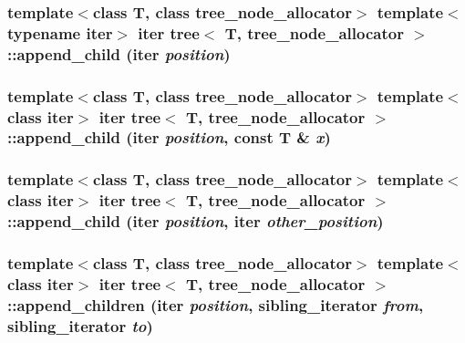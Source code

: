 \hypertarget{classtree_8d68e95f5088d48cb54fd6ae381729f0}{
\subsubsection{\setlength{\rightskip}{0pt plus 5cm}template$<$class T, class tree\_\-node\_\-allocator$>$ template$<$typename iter$>$ iter {\bf tree}$<$ T, tree\_\-node\_\-allocator $>$::append\_\-child (iter {\em position})}}
\label{classtree_8d68e95f5088d48cb54fd6ae381729f0}


\hypertarget{classtree_9318fa77c4e10ec0a9a26a0d08f182a2}{
\subsubsection{\setlength{\rightskip}{0pt plus 5cm}template$<$class T, class tree\_\-node\_\-allocator$>$ template$<$class iter$>$ iter {\bf tree}$<$ T, tree\_\-node\_\-allocator $>$::append\_\-child (iter {\em position}, \/  const T \& {\em x})}}
\label{classtree_9318fa77c4e10ec0a9a26a0d08f182a2}


\hypertarget{classtree_1fb4734b783fed4a66c24130af67316e}{
\subsubsection{\setlength{\rightskip}{0pt plus 5cm}template$<$class T, class tree\_\-node\_\-allocator$>$ template$<$class iter$>$ iter {\bf tree}$<$ T, tree\_\-node\_\-allocator $>$::append\_\-child (iter {\em position}, \/  iter {\em other\_\-position})}}
\label{classtree_1fb4734b783fed4a66c24130af67316e}


\hypertarget{classtree_92ab22e0a98d8899c0d1b6c9d0a85465}{
\subsubsection{\setlength{\rightskip}{0pt plus 5cm}template$<$class T, class tree\_\-node\_\-allocator$>$ template$<$class iter$>$ iter {\bf tree}$<$ T, tree\_\-node\_\-allocator $>$::append\_\-children (iter {\em position}, \/  {\bf sibling\_\-iterator} {\em from}, \/  {\bf sibling\_\-iterator} {\em to})}}
\label{classtree_92ab22e0a98d8899c0d1b6c9d0a85465}



